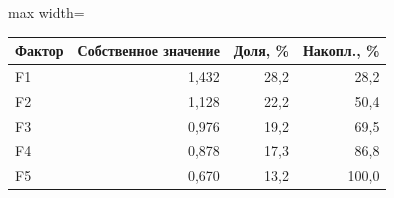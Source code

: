 {%
\small
\setlength{\tabcolsep}{3.0pt}
\renewcommand{\arraystretch}{1.12}
\begin{adjustbox}{max width=\textwidth}
\begin{tabular}{lrrr}
\toprule
Фактор & Собственное значение & Доля, \% & Накопл., \% \\
\midrule
F1 & 1,432 & 28,2 & 28,2 \\
F2 & 1,128 & 22,2 & 50,4 \\
F3 & 0,976 & 19,2 & 69,5 \\
F4 & 0,878 & 17,3 & 86,8 \\
F5 & 0,670 & 13,2 & 100,0 \\
\bottomrule
\end{tabular}
\end{adjustbox}
}